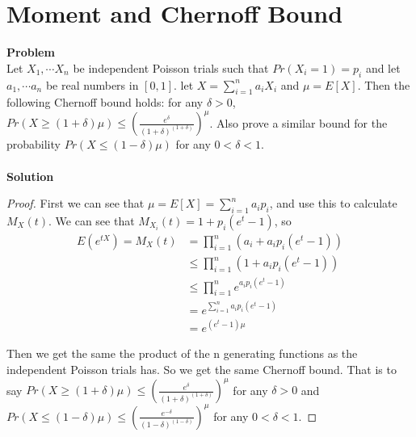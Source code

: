 \section{Moment and Chernoff Bound}
\textbf{Problem}\\
Let $X_1, \cdots X_n$ be independent Poisson trials such that $Pr(X_i = 1) = p_i$ and let $a_1, \cdots a_n$ be real numbers in $[0, 1]$. let $X = \sum_{i=1}^{n} a_iX_i$ and $\mu = E[X]$. Then the following Chernoff bound holds: for any $\delta > 0$, $Pr(X \ge (1+\delta) \mu) \le (\frac{e^\delta}{(1+\delta)^{(1+\delta)}})^\mu$. Also prove a similar bound for the probability $Pr(X \le (1-\delta)\mu)$ for any $0 < \delta < 1$.\\\\
\textbf{Solution}\\
\begin{proof}
	First we can see that $\mu=E[X]=\sum_{i=1}^{n} a_ip_i$, and use this to calculate $M_X(t)$. We can see that $M_{X_i}(t) = 1+p_i(e^t-1)$, so
\begin{equation*}
\begin{split}
E(e^{tX}) = M_X(t) &= \prod_{i=1}^{n} (a_i + a_i p_i (e^t-1)) \\
&\le \prod_{i=1}^{n} (1 + a_i p_i (e^t-1)) \\
&\le \prod_{i=1}^{n} e^{a_i p_i (e^t-1)} \\
&= e^{\sum_{i=1}^{n} a_i p_i (e^t-1)} \\
&= e^{(e^t-1)\mu}
\end{split}
\end{equation*}

Then we get the same the product of the n generating functions as the independent Poisson trials has. So we get the same Chernoff bound.
That is to say
$Pr(X \ge (1+\delta) \mu) \le (\frac{e^\delta}{(1+\delta)^{(1+\delta)}})^\mu$ for any $\delta>0$ and  $Pr(X \le (1-\delta)\mu)\le (\frac{e^{-\delta}}{(1-\delta)^{(1-\delta)}})^\mu$ for any $0 < \delta < 1$.
\end{proof}

